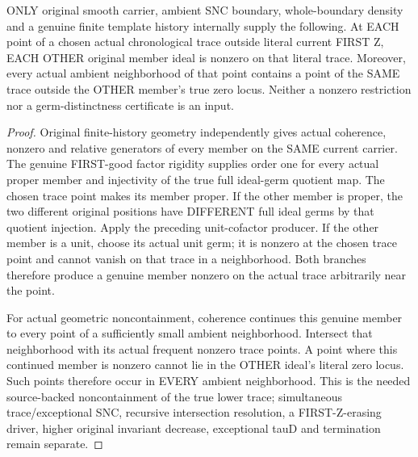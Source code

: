 \begin{theorem}
\label{hir:sharp-original-first-good-other-member-trace-nonzero}
\leanok
ONLY original smooth carrier, ambient SNC boundary, whole-boundary density
and a genuine finite template history internally supply the following.
At EACH point of a chosen actual chronological trace outside literal
current FIRST Z, EACH OTHER original member ideal is nonzero on that
literal trace. Moreover, every actual ambient neighborhood of that point
contains a point of the SAME trace outside the OTHER member's true zero
locus. Neither a nonzero restriction nor a germ-distinctness certificate
is an input.
\end{theorem}
\begin{proof}
Original finite-history geometry independently gives actual coherence,
nonzero and relative generators of every member on the SAME current
carrier. The genuine FIRST-good factor rigidity supplies order one for
every actual proper member and injectivity of the true full ideal-germ
quotient map. The chosen trace point makes its member proper. If the
other member is proper, the two different original positions have
DIFFERENT full ideal germs by that quotient injection. Apply the preceding
unit-cofactor producer. If the other member is a unit, choose its actual
unit germ; it is nonzero at the chosen trace point and cannot vanish on
that trace in a neighborhood. Both branches therefore produce a genuine
member nonzero on the actual trace arbitrarily near the point.

For actual geometric noncontainment, coherence continues this genuine
member to every point of a sufficiently small ambient neighborhood.
Intersect that neighborhood with its actual frequent nonzero trace
points. A point where this continued member is nonzero cannot lie in the
OTHER ideal's literal zero locus. Such points therefore occur in EVERY
ambient neighborhood. This is the needed source-backed noncontainment
of the true lower trace; simultaneous trace/exceptional SNC, recursive
intersection resolution, a FIRST-Z-erasing driver, higher original
invariant decrease, exceptional tauD and termination remain separate.
\end{proof}
